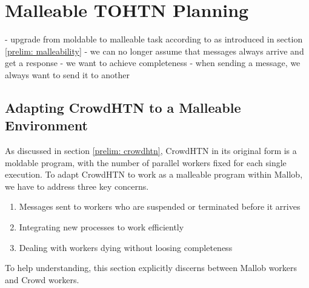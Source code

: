 \section{Malleable TOHTN Planning}
- upgrade from moldable to malleable task according to \cite{feitelson1997job} as introduced in section \ref{prelim: malleability}
- we can no longer assume that messages always arrive and get a response
- we want to achieve completeness
- when sending a message, we always want to send it to another 

\subsection{Adapting CrowdHTN to a Malleable Environment}
As discussed in section \ref{prelim: crowdhtn}, CrowdHTN in its original form is a moldable program, with the number of parallel workers fixed for each single execution. To adapt CrowdHTN to work as a malleable program within Mallob, we have to address three key concerns.
\begin{enumerate}
	\item Messages sent to workers who are suspended or terminated before it arrives
	\item Integrating new processes to work efficiently
	\item Dealing with workers dying without loosing completeness
\end{enumerate}
To help understanding, this section explicitly discerns between Mallob workers and Crowd workers. 
